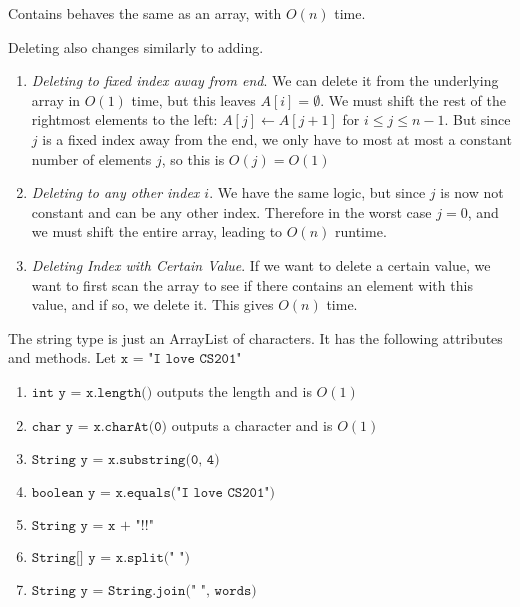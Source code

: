   \begin{algo}
    Contains behaves the same as an array, with $O(n)$ time. 
  \end{algo} 

  \begin{algo}
    Deleting also changes similarly to adding. 
    \begin{enumerate}
      \item \textit{Deleting to fixed index away from end}. We can delete it from the underlying array in $O(1)$ time, but this leaves $A[i] = \emptyset$. We must shift the rest of the rightmost elements to the left: $A[j] \gets A[j+1]$ for $i \leq j \leq n-1$. But since $j$ is a fixed index away from the end, we only have to most at most a constant number of elements $j$, so this is $O(j) = O(1)$
      \item \textit{Deleting to any other index $i$}. We have the same logic, but since $j$ is now not constant and can be any other index. Therefore in the worst case $j = 0$, and we must shift the entire array, leading to $O(n)$ runtime. 
      \item \textit{Deleting Index with Certain Value}. If we want to delete a certain value, we want to first scan the array to see if there contains an element with this value, and if so, we delete it. This gives $O(n)$ time.  
    \end{enumerate}
  \end{algo} 

  \begin{example}[String]
    The string type is just an ArrayList of characters. It has the following attributes and methods. Let $\texttt{x = "I love CS201"}$ 
    \begin{enumerate}
      \item $\texttt{int y = x.length()}$ outputs the length and is $O(1)$ 
      \item $\texttt{char y = x.charAt(0)}$ outputs a character and is $O(1)$
      \item $\texttt{String y = x.substring(0, 4)}$ 
      \item $\texttt{boolean y = x.equals("I love CS201")}$
      \item $\texttt{String y = x + "!!"}$ 
      \item $\texttt{String[] y = x.split(" ")}$
      \item $\texttt{String y = String.join(" ", words)}$
    \end{enumerate}
  \end{example} 

